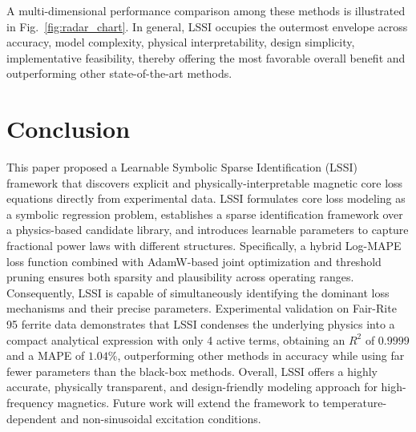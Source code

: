 \documentclass[lettersize,journal]{IEEEtran}
\begin{document}
A multi-dimensional performance comparison among these methods is illustrated in Fig.~\ref{fig:radar_chart}. In general, LSSI occupies the outermost envelope across accuracy, model complexity, physical interpretability, design simplicity, implementative feasibility, thereby offering the most favorable overall benefit and outperforming other state-of-the-art methods.

\section{Conclusion}
This paper proposed a Learnable Symbolic Sparse Identification (LSSI) framework that discovers explicit and physically-interpretable magnetic core loss equations directly from experimental data. LSSI formulates core loss modeling as a symbolic regression problem, establishes a sparse identification framework over a physics-based candidate library, and introduces learnable parameters to capture fractional power laws with different structures. Specifically, a hybrid Log-MAPE loss function combined with AdamW-based joint optimization and threshold pruning ensures both sparsity and plausibility across operating ranges. Consequently, LSSI is capable of simultaneously identifying the dominant loss mechanisms and their precise parameters. Experimental validation on Fair-Rite 95 ferrite data demonstrates that LSSI condenses the underlying physics into a compact analytical expression with only 4 active terms, obtaining an $R^2$ of $0.9999$ and a MAPE of $1.04\%$, outperforming other methods in accuracy while using far fewer parameters than the black-box methods. Overall, LSSI offers a highly accurate, physically transparent, and design-friendly modeling approach for high-frequency magnetics. Future work will extend the framework to temperature-dependent and non-sinusoidal excitation conditions.







% 









\vfill
\end{document}
